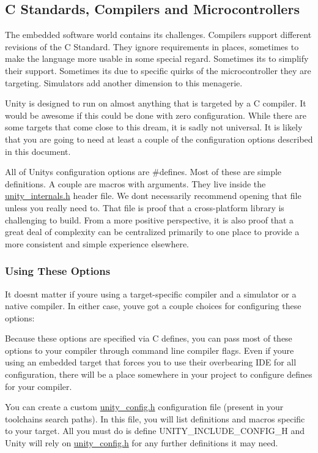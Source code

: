 \subsection*{C Standards, Compilers and Microcontrollers}

The embedded software world contains its challenges. Compilers support different revisions of the C Standard. They ignore requirements in places, sometimes to make the language more usable in some special regard. Sometimes it\textquotesingle{}s to simplify their support. Sometimes it\textquotesingle{}s due to specific quirks of the microcontroller they are targeting. Simulators add another dimension to this menagerie.

Unity is designed to run on almost anything that is targeted by a C compiler. It would be awesome if this could be done with zero configuration. While there are some targets that come close to this dream, it is sadly not universal. It is likely that you are going to need at least a couple of the configuration options described in this document.

All of Unity\textquotesingle{}s configuration options are {\ttfamily \#defines}. Most of these are simple definitions. A couple are macros with arguments. They live inside the \hyperlink{unity__internals_8h_source}{unity\+\_\+internals.\+h} header file. We don\textquotesingle{}t necessarily recommend opening that file unless you really need to. That file is proof that a cross-\/platform library is challenging to build. From a more positive perspective, it is also proof that a great deal of complexity can be centralized primarily to one place to provide a more consistent and simple experience elsewhere.

\subsubsection*{Using These Options}

It doesn\textquotesingle{}t matter if you\textquotesingle{}re using a target-\/specific compiler and a simulator or a native compiler. In either case, you\textquotesingle{}ve got a couple choices for configuring these options\+:


\begin{DoxyEnumerate}
\item Because these options are specified via C defines, you can pass most of these options to your compiler through command line compiler flags. Even if you\textquotesingle{}re using an embedded target that forces you to use their overbearing I\+DE for all configuration, there will be a place somewhere in your project to configure defines for your compiler.
\item You can create a custom {\ttfamily \hyperlink{unity__config_8h_source}{unity\+\_\+config.\+h}} configuration file (present in your toolchain\textquotesingle{}s search paths). In this file, you will list definitions and macros specific to your target. All you must do is define {\ttfamily U\+N\+I\+T\+Y\+\_\+\+I\+N\+C\+L\+U\+D\+E\+\_\+\+C\+O\+N\+F\+I\+G\+\_\+H} and Unity will rely on {\ttfamily \hyperlink{unity__config_8h_source}{unity\+\_\+config.\+h}} for any further definitions it may need.
\end{DoxyEnumerate}

